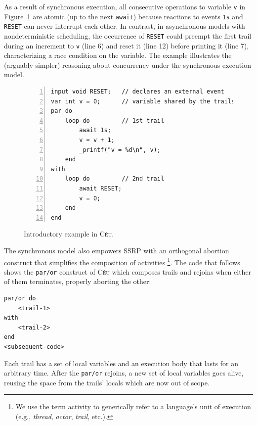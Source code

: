\documentclass{sigplanconf}
\newcommand{\CEU}{\textsc{C\'{e}u}\xspace}
\newcommand{\code}[1] {{\small{\texttt{#1}}}}
\newcommand{\1}{\;}
\newcommand{\2}{\;\;}
\newcommand{\3}{\;\;\;}
\newcommand{\5}{\;\;\;\;\;}
\begin{document}
As a result of synchronous execution, all consecutive operations to variable 
\code{v} in Figure~\ref{lst.intro} are atomic (up to the next \code{await}) 
because reactions to events \code{1s} and \code{RESET} can never interrupt each 
other.
%
In contrast, in asynchronous models with nondeterministic scheduling, the 
occurrence of \code{RESET} could preempt the first trail during an increment to 
\code{v} (line 6) and reset it (line 12) before printing it (line 7), 
characterizing a race condition on the variable.
%
The example illustrates the (arguably simpler) reasoning about concurrency 
under the synchronous execution model.

\begin{figure}[t]
\begin{lstlisting}[numbers=left,xleftmargin=3em]
input void RESET;   // declares an external event
var int v = 0;      // variable shared by the trails
par do
    loop do         // 1st trail
        await 1s;
        v = v + 1;
        _printf("v = %d\n", v);
    end
with
    loop do         // 2nd trail
        await RESET;
        v = 0;
    end
end
\end{lstlisting}
\caption{ Introductory example in \CEU.
\label{lst.intro}
}
\end{figure}


The synchronous model also empowers SSRP with an orthogonal abortion construct 
that simplifies the composition of activities%
\footnote{We use the term activity to generically refer to a language's unit of 
execution (e.g., \emph{thread}, \emph{actor}, \emph{trail}, etc.).}.
%
%
The code that follows shows the \code{par/or} construct of \CEU which composes 
trails and rejoins when either of them terminates, properly aborting the other:

\begin{lstlisting}
par/or do
    <trail-1>
with
    <trail-2>
end
<subsequent-code>
\end{lstlisting}

Each trail has a set of local variables and an execution body that lasts for an 
arbitrary time.
After the \code{par/or} rejoins, a new set of local variables goes alive, 
reusing the space from the trails' locals which are now out of scope.
\end{document}
